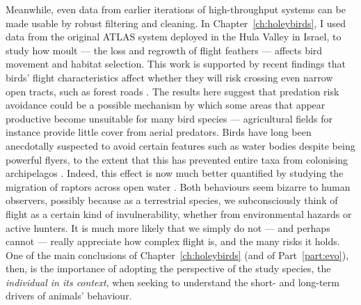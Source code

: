 Meanwhile, even data from earlier iterations of high-throughput systems can be made usable by robust filtering and cleaning.
In Chapter~\ref{ch:holeybirds}, I used data from the original ATLAS system deployed in the Hula Valley in Israel, to study how moult --- the loss and regrowth of flight feathers --- affects bird movement and habitat selection.
This work is supported by recent findings that birds' flight characteristics affect whether they will risk crossing even narrow open tracts, such as forest roads \citep{claramunt2022}.
The results here suggest that predation risk avoidance could be a possible mechanism by which some areas that appear productive become unsuitable for many bird species --- agricultural fields for instance provide little cover from aerial predators.
Birds have long been anecdotally suspected to avoid certain features such as water bodies despite being powerful flyers, to the extent that this has prevented entire taxa from colonising archipelagos  \citep{diamond1981}.
Indeed, this effect is now much better quantified by studying the migration of raptors across open water \citep{nourani2020}.
Both behaviours seem bizarre to human observers, possibly because as a terrestrial species, we subconsciously think of flight as a certain kind of invulnerability, whether from environmental hazards or active hunters.
It is much more likely that we simply do not --- and perhaps cannot --- really appreciate how complex flight is, and the many risks it holds.
One of the main conclusions of Chapter~\ref{ch:holeybirds} (and of Part~\ref{part:evo}), then, is the importance of adopting the perspective of the study species, the \textit{individual in its context}, when seeking to understand the short- and long-term drivers of animals' behaviour.

